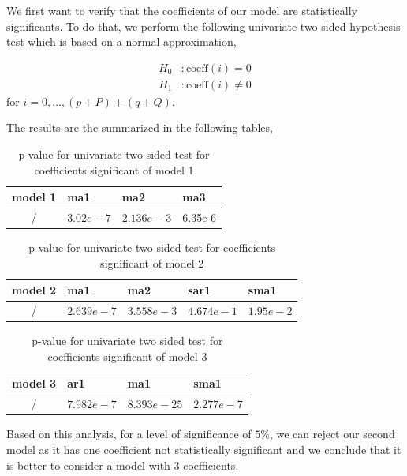 We first want to verify that the coefficients of our model are statistically significants. To do that, we perform the following univariate two sided hypothesis test which is based on a normal approximation,

\begin{align*}
	H_0&: \text{coeff}(i) = 0 \\
	H_1&: \text{coeff}(i) \neq 0
\end{align*}
for $i = 0,\dots,(p + P) + (q + Q)$.

The results are the summarized in the following tables,
\begin{table}[H]
	\centering
	\begin{tabular}{|c|l|l|l|}
		\hline
		\textbf{model 1}    & ma1			& ma2			& ma3 \\\hline
		    /				& $3.02e-7$ 	& $2.136e-3$ 	& 6.35e-6 \\\hline
	\end{tabular}
	\caption{p-value for univariate two sided test for coefficients significant of model 1}
	\label{tab:coefficients-significance-model1}
\end{table}

\begin{table}[H]
	\centering
	\begin{tabular}{|c|l|l|l|l|}
		\hline
		\textbf{model 2}    & ma1			& ma2			& sar1		 & sma1		 \\\hline
		    /				& $2.639e-7$ 	& $3.558e-3$ 	& $4.674e-1$ & $1.95e-2$ \\\hline
	\end{tabular}
	\caption{p-value for univariate two sided test for coefficients significant of model 2}
	\label{tab:coefficients-significance-model2}
\end{table}

\begin{table}[H]
	\centering
	\begin{tabular}{|c|l|l|l|}
		\hline
		\textbf{model 3}    & ar1			& ma1			& sma1 \\\hline
		    /				& $7.982e-7$ 	& $8.393e-25$ 	& $2.277e-7$ \\\hline
	\end{tabular}
	\caption{p-value for univariate two sided test for coefficients significant of model 3}
	\label{tab:coefficients-significance-model3}
\end{table}

Based on this analysis, for a level of significance of $5\%$, we can reject our second model as it has one coefficient not statistically significant and we conclude that it is better to consider a model with $3$ coefficients.


